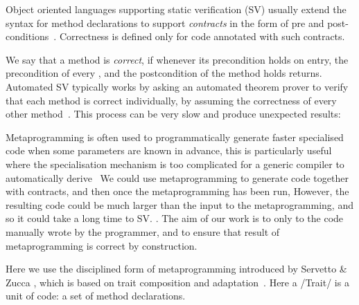 \noindent Object oriented languages supporting static verification (SV) usually extend the syntax for method declarations
to support \emph{contracts} in the form of pre and post-conditions~\cite{Meyer:1988:OSC:534929}.
Correctness is defined only for code annotated with such contracts.

We say that a method is \emph{correct}, if whenever its precondition holds on entry, the precondition of every , and the postcondition of the method holds  returns. Automated SV typically works by asking an automated theorem prover to verify that each method is correct individually, by assuming the correctness of every other method~\cite{barnett2004spec}. This process can be very slow and  produce unexpected results: 

Metaprogramming is often used to programmatically generate faster specialised code when some parameters are known in advance, this is particularly useful where the specialisation mechanism is too complicated for a generic compiler to automatically derive~\cite{Ofenbeck:2017:SGP:3136040.3136060}
We could use metaprogramming to generate code together with contracts, and then once the metaprogramming has been run,
 However, the resulting code could be much larger than the input to the metaprogramming, and so it could take a long time to SV.
.
The aim of our work is to  only to the code manually wrote by the programmer, 
and to ensure that  result of metaprogramming is  correct by construction.

Here we use the disciplined form of metaprogramming introduced by Servetto \& Zucca \cite{servetto2014meta}, which is based on trait composition and adaptation~\cite{scharli2003traits}.
Here a /Trait/ is a unit of code: a set of method declarations.

